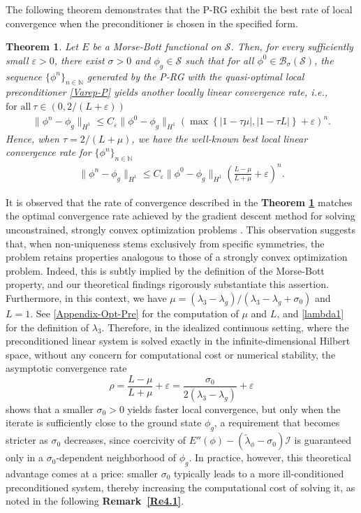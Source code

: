 \documentclass[preprint,3p]{elsarticle}
\newtheorem{thm}{Theorem}[section]
\begin{document}
The following theorem demonstrates that the P-RG exhibit the best rate of local convergence when the preconditioner is chosen in the specified form.
\begin{thm}\label{Var-P-convergence}
	Let $E$ be a Morse-Bott functional on $\mathcal{S}$. Then, for every sufficiently small $\varepsilon > 0$, there exist $\sigma>0$ and $\phi_g \in \mathcal{S}$ such that for all $\phi^0 \in \mathcal{B}_{\sigma}(\mathcal{S})$, the sequence $\{\phi^n\}_{n\in\mathbb{N}}$ generated by the P-RG with the quasi-optimal local preconditioner \eqref{Varep-P} yields another locally linear convergence rate, i.e., $\text{for all}\ \tau\in(0,2/(L+\varepsilon))$
	\begin{align*}
		\|\phi^n-\phi_g\|_{H^1}\le C_{\varepsilon}\|\phi^0-\phi_g\|_{H^1}\left(\max\left\{|1-\tau\mu|,|1-\tau L |\right\}+\varepsilon\right)^n.
	\end{align*}
	Hence, when $\tau=2/(L+\mu)$, we have the well-known best local linear convergence rate for $\big\{\phi^n\big\}_{n\in\mathbb{N}}$
	{\rm\begin{align}
			\|\phi^n-\phi_g\|_{H^1}\le C_{\varepsilon}\|\phi^0-\phi_g\|_{H^1}\left(\frac{L-\mu}{L+\mu}+\varepsilon\right)^n.
	\end{align}}
\end{thm}
It is observed that the rate of convergence described in the {\bf Theorem \ref{Var-P-convergence}} matches the optimal convergence rate achieved by the gradient descent method for solving unconstrained, strongly convex optimization problems \cite{2006Numerical}. This observation suggests that, when non-uniqueness stems exclusively from specific symmetries, the problem retains properties analogous to those of a strongly convex optimization problem. Indeed, this is subtly implied by the definition of the Morse-Bott property, and our theoretical findings rigorously substantiate this assertion. Furthermore, in this context, we have $\mu = (\lambda_3 - \lambda_g)\big/(\lambda_3 - \lambda_g + \sigma_0)$ and $L = 1$. See \ref{Appendix-Opt-Pre} for the computation of $\mu$ and $L$, and \eqref{lambda1} for the definition of $\lambda_3$. {Therefore, in the idealized continuous setting, where the preconditioned linear system is solved exactly in the infinite-dimensional Hilbert space, without any concern for computational cost or numerical stability, the asymptotic convergence rate 
	\[
	\rho = \frac{L-\mu}{L+\mu} +\varepsilon= \frac{\sigma_0}{2(\lambda_3 - \lambda_g)} + \varepsilon
	\] 
	shows that a smaller $\sigma_0 > 0$ yields faster local convergence, but only when the iterate is sufficiently close to the ground state $\phi_g$, a requirement that becomes stricter as $\sigma_0$ decreases, since coercivity of $E''(\phi) - (\widetilde{\lambda}_{\phi} - \sigma_0)\mathcal{I}$ is guaranteed only in a $\sigma_0$-dependent neighborhood of $\phi_g$. In practice, however, this theoretical advantage comes at a price: smaller $\sigma_0$ typically leads to a more ill-conditioned preconditioned system, thereby increasing the computational cost of solving it, as noted in the following \textbf{Remark~\ref{Re4.1}}.}
\end{document}
